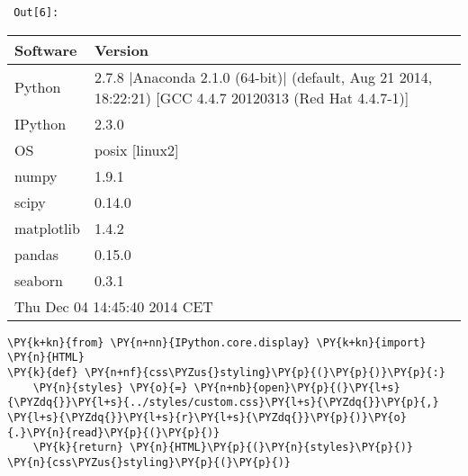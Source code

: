         {\par%
        \vspace{-1\smallerfontscale}%
        \noindent%
        \begin{minipage}{\cellleftmargin}%
    \hfill%
    {\smaller%
    \tt%
    \color{nbframe-out-prompt}%
    Out[6]:}%
    \hspace{\inputpadding}%
    \hspace{0em}%
    \hspace{3pt}%
    \end{minipage}%
        }%
    \begin{addmargin}[\cellleftmargin]{0em}%
    {\smaller%
    \vspace{-1\smallerfontscale}%
    
    
    \begin{tabular}{|l|l|}\hline
{\bf Software} & {\bf Version} \\ \hline\hline
Python & 2.7.8 |Anaconda 2.1.0 (64-bit)| (default, Aug 21 2014, 18:22:21) [GCC 4.4.7 20120313 (Red Hat 4.4.7-1)] \\ \hline
IPython & 2.3.0 \\ \hline
OS & posix [linux2] \\ \hline
numpy & 1.9.1 \\ \hline
scipy & 0.14.0 \\ \hline
matplotlib & 1.4.2 \\ \hline
pandas & 0.15.0 \\ \hline
seaborn & 0.3.1 \\ \hline
\hline \multicolumn{2}{|l|}{Thu Dec 04 14:45:40 2014 CET} \\ \hline
\end{tabular}


    
}%
    \end{addmargin}%

{\par%
\vspace{-1\baselineskip}%
}%
\begin{notebookcell}[2]%
\begin{addmargin}[\cellleftmargin]{0em}%
{\smaller%
\par%
%
\vspace{-1\smallerfontscale}%
\begin{Verbatim}[commandchars=\\\{\}]
\PY{k+kn}{from} \PY{n+nn}{IPython.core.display} \PY{k+kn}{import} \PY{n}{HTML}
\PY{k}{def} \PY{n+nf}{css\PYZus{}styling}\PY{p}{(}\PY{p}{)}\PY{p}{:}
    \PY{n}{styles} \PY{o}{=} \PY{n+nb}{open}\PY{p}{(}\PY{l+s}{\PYZdq{}}\PY{l+s}{../styles/custom.css}\PY{l+s}{\PYZdq{}}\PY{p}{,} \PY{l+s}{\PYZdq{}}\PY{l+s}{r}\PY{l+s}{\PYZdq{}}\PY{p}{)}\PY{o}{.}\PY{n}{read}\PY{p}{(}\PY{p}{)}
    \PY{k}{return} \PY{n}{HTML}\PY{p}{(}\PY{n}{styles}\PY{p}{)}
\PY{n}{css\PYZus{}styling}\PY{p}{(}\PY{p}{)}
\end{Verbatim}
%
\par%
\vspace{-1\smallerfontscale}}%
\end{addmargin}
\end{notebookcell}


